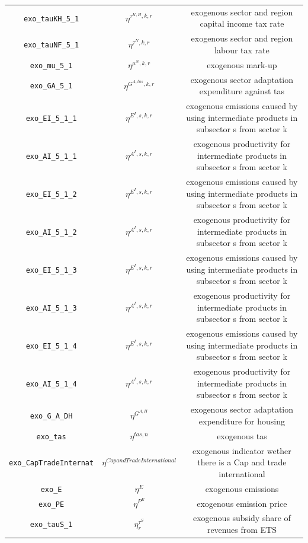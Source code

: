 \begin{center}
\begin{longtable}{ccc}
\texttt{exo\_tauKH\_5\_1} & ${\eta^{\tau^{K,H},k,r}}$ & exogenous sector and region capital income tax rate\\
\texttt{exo\_tauNF\_5\_1} & ${\eta^{\tau^{N},k,r}}$ & exogenous sector and region labour tax rate\\
\texttt{exo\_mu\_5\_1} & ${\eta^{\mu^{N},k,r}}$ & exogenous mark-up\\
\texttt{exo\_GA\_5\_1} & ${\eta^{G^{A,tas},k,r}}$ & exogenous sector adaptation expenditure against tas\\
\texttt{exo\_EI\_5\_1\_1} & ${\eta^{E^{I},s,k,r}}$ & exogenous emissions caused by using intermediate products in subsector s from sector k\\
\texttt{exo\_AI\_5\_1\_1} & ${\eta^{A^{I},s,k,r}}$ & exogenous productivity for intermediate products in subsector s from sector k\\
\texttt{exo\_EI\_5\_1\_2} & ${\eta^{E^{I},s,k,r}}$ & exogenous emissions caused by using intermediate products in subsector s from sector k\\
\texttt{exo\_AI\_5\_1\_2} & ${\eta^{A^{I},s,k,r}}$ & exogenous productivity for intermediate products in subsector s from sector k\\
\texttt{exo\_EI\_5\_1\_3} & ${\eta^{E^{I},s,k,r}}$ & exogenous emissions caused by using intermediate products in subsector s from sector k\\
\texttt{exo\_AI\_5\_1\_3} & ${\eta^{A^{I},s,k,r}}$ & exogenous productivity for intermediate products in subsector s from sector k\\
\texttt{exo\_EI\_5\_1\_4} & ${\eta^{E^{I},s,k,r}}$ & exogenous emissions caused by using intermediate products in subsector s from sector k\\
\texttt{exo\_AI\_5\_1\_4} & ${\eta^{A^{I},s,k,r}}$ & exogenous productivity for intermediate products in subsector s from sector k\\
\texttt{exo\_G\_A\_DH} & ${\eta^{G^{A,H}}}$ & exogenous sector adaptation expenditure for housing\\
\texttt{exo\_tas} & ${\eta^{tas,n}}$ & exogenous tas\\
\texttt{exo\_CapTradeInternat} & ${\eta^{Cap and Trade International}}$ & exogenous indicator wether there is a Cap and trade international\\
\texttt{exo\_E} & ${\eta^{E}}$ & exogenous emissions\\
\texttt{exo\_PE} & ${\eta^{P^E}}$ & exogenous emission price\\
\texttt{exo\_tauS\_1} & ${\eta^{\tau^{S}}_r}$ & exogenous subsidy share of revenues from ETS\\

\end{longtable}
\end{center}
